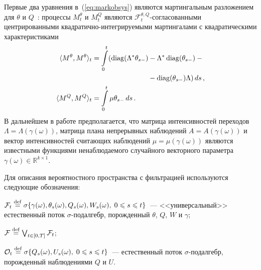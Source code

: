 \begin{multicols}{2}
 Первые два уравнения в~(\ref{eq:markobsys})
 являются мартингальным разложением для $\theta$ и $Q$~\cite{elliott2}:
 процессы $M^{\theta}_t$ и $M^{Q}_t$ являются
$\mathcal{F}_t^{\theta,Q}$-согласованными
 центрированными квадратично-интегрируемыми мартингалами с
 квадратическими характеристиками
\begin{align*}
\langle M^{\theta}, M^{\theta}\rangle _t &= \displaystyle \int\limits_0^t
(\diag(\Lambda^*\theta_{s-})- \Lambda^*\diag(\theta_{s-})-{}\\
&\hspace*{80pt}-\diag(\theta_{s-})\Lambda)\,ds\,,\\
\langle M^{Q}, M^{Q}\rangle _t &= \displaystyle \int\limits_0^t
\mu\theta_{s-}\,ds\,.\hfill\
\end{align*}
 В дальнейшем в работе предполагается, что мат\-ри\-ца интенсивностей переходов $\Lambda=\Lambda(\gamma(\omega))$,
 мат\-ри\-ца плана непрерывных наблюдений
 $A=A(\gamma(\omega))$ и вектор интенсивностей считающих наблюдений $\mu=\mu(\gamma(\omega))$
 являются известными функциями ненаблюдаемого случайного векторного параметра $\gamma(\omega) \in \mathbb{R}^{k \times 1}$.

 Для описания вероятностного пространства с фильтрацией используются
 следующие обозначения:
\begin{description}
\item $\mathcal{F}_t \stackrel{\mathrm {def}}{=} \sigma \{
\gamma(\omega),\theta_s(\omega), Q_s(\omega), W_s(\omega),\; 0
\leqslant s \leqslant t \}$~--- <<универсальный>>
 естественный поток $\sigma$-подал\-гебр, порожденный $\theta$, $Q$, $W$
и $\gamma$; \\
\item $\mathcal{F} \stackrel{\mathrm {def}}{=} \bigvee_{t\in[0,T]}\mathcal{F}_t$;\\
\item $\mathcal{O}_t \stackrel{\mathrm {def}}{=} \sigma \{ Q_s(\omega), U_s(\omega), \;
0 \leqslant s \leqslant t\}$~--- естественный поток
$\sigma$-подалгебр, порожденный наблюдениями $Q$ и $U$.
\end{description}


\end{multicols}
